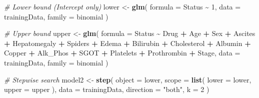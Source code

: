\documentclass[
]{article}
\newenvironment{Shaded}{\begin{snugshade}}{\end{snugshade}}
\newcommand{\AttributeTok}[1]{\textcolor[rgb]{0.13,0.29,0.53}{#1}}
\newcommand{\CommentTok}[1]{\textcolor[rgb]{0.56,0.35,0.01}{\textit{#1}}}
\newcommand{\DecValTok}[1]{\textcolor[rgb]{0.00,0.00,0.81}{#1}}
\newcommand{\FunctionTok}[1]{\textcolor[rgb]{0.13,0.29,0.53}{\textbf{#1}}}
\newcommand{\NormalTok}[1]{#1}
\newcommand{\OtherTok}[1]{\textcolor[rgb]{0.56,0.35,0.01}{#1}}
\newcommand{\SpecialCharTok}[1]{\textcolor[rgb]{0.81,0.36,0.00}{\textbf{#1}}}
\newcommand{\StringTok}[1]{\textcolor[rgb]{0.31,0.60,0.02}{#1}}
\begin{document}
\begin{Shaded}
\begin{Highlighting}[]
\CommentTok{\# Lower bound (Intercept only)}
\NormalTok{lower }\OtherTok{\textless{}{-}} \FunctionTok{glm}\NormalTok{(}
  \AttributeTok{formula =}\NormalTok{ Status }\SpecialCharTok{\textasciitilde{}} \DecValTok{1}\NormalTok{,}
  \AttributeTok{data =}\NormalTok{ trainingData,}
  \AttributeTok{family =}\NormalTok{ binomial}
\NormalTok{)}

\CommentTok{\# Upper bound }
\NormalTok{upper }\OtherTok{\textless{}{-}} \FunctionTok{glm}\NormalTok{(}
  \AttributeTok{formula =}\NormalTok{ Status }\SpecialCharTok{\textasciitilde{}}\NormalTok{ Drug }\SpecialCharTok{+}\NormalTok{ Age }\SpecialCharTok{+}\NormalTok{ Sex }\SpecialCharTok{+}\NormalTok{ Ascites }\SpecialCharTok{+}\NormalTok{ Hepatomegaly }\SpecialCharTok{+}\NormalTok{ Spiders }\SpecialCharTok{+}\NormalTok{ Edema }\SpecialCharTok{+}\NormalTok{ Bilirubin }\SpecialCharTok{+}\NormalTok{ Cholesterol }\SpecialCharTok{+}\NormalTok{ Albumin }\SpecialCharTok{+}\NormalTok{ Copper }\SpecialCharTok{+}\NormalTok{ Alk\_Phos }\SpecialCharTok{+}\NormalTok{ SGOT }\SpecialCharTok{+}\NormalTok{ Platelets }\SpecialCharTok{+}\NormalTok{ Prothrombin }\SpecialCharTok{+}\NormalTok{ Stage,}
  \AttributeTok{data =}\NormalTok{ trainingData,}
  \AttributeTok{family =}\NormalTok{ binomial}
\NormalTok{)}


\CommentTok{\# Stepwise search}
\NormalTok{model2 }\OtherTok{\textless{}{-}} \FunctionTok{step}\NormalTok{(}
  \AttributeTok{object =}\NormalTok{ lower,}
  \AttributeTok{scope =} \FunctionTok{list}\NormalTok{(}
    \AttributeTok{lower =}\NormalTok{ lower,}
    \AttributeTok{upper =}\NormalTok{ upper}
\NormalTok{  ),}
  \AttributeTok{data =}\NormalTok{ trainingData,}
  \AttributeTok{direction =} \StringTok{"both"}\NormalTok{,}
  \AttributeTok{k =} \DecValTok{2}
\NormalTok{)}
\end{Highlighting}
\end{Shaded}
\end{document}
